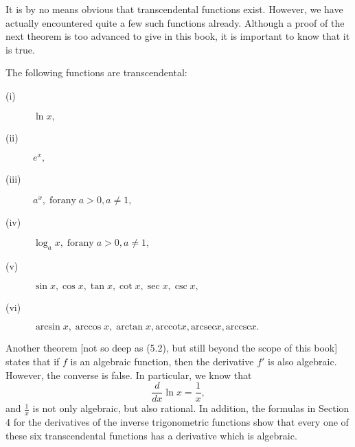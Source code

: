 It is by no means obvious that transcendental functions exist. However, we have actually
encountered quite a few such functions already. Although a proof of the next theorem is too
advanced to give in this book, it is important to know that it is true.

\begin{theorem} %
The following functions are transcendental:

 
\begin{description}
\item[(i)] $\ln x,$  
\item[(ii)] $e^{x},$
\item[(iii)] $a^{x}, \;\mathrm{for any}\; a > 0, a \neq 1,$
\item[(iv)] $\log_{a}x, \;\mathrm{for any}\; a > 0, a \neq 1,$
\item[(v)] $\sin x, \cos x, \tan x, \cot x, \sec x, \csc x,$
\item[(vi)] $\arcsin x, \arccos x, \arctan x, \mathrm{arccot} x, \mathrm{arcsec} x, \mathrm{arccsc} x.$
\end{description}
 
\end{theorem}

Another theorem [not so deep as (5.2), but still beyond the scope of this book] states that if $f$ is
an algebraic function, then the derivative $f'$ is also algebraic. However, the converse is false. In
particular, we know that
$$
\frac{d}{dx} \ln x = \frac{1}{x}, 
$$
\noindent and $\frac{1}{x}$ is not only algebraic, but also rational. In addition, the formulas in
Section 4 for the derivatives of the inverse trigonometric functions show that every one of
these six transcendental functions has a derivative which is algebraic.



